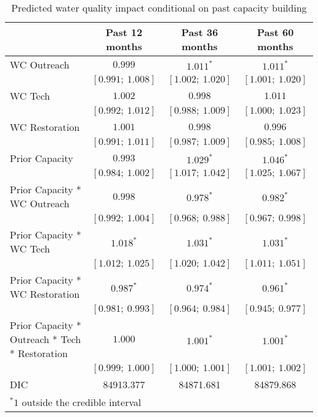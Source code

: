 
\begin{table}
\caption{Predicted water quality impact conditional on past capacity building}
\begin{center}
\begin{tabular}{l c c c }
\hline
                                               & Past 12 months & Past 36 months & Past 60 months \\
\hline
WC Outreach                                    & $0.999$           & $1.011^{*}$       & $1.011^{*}$       \\
                                               & $[0.991;\ 1.008]$ & $[1.002;\ 1.020]$ & $[1.001;\ 1.020]$ \\
WC Tech                                        & $1.002$           & $0.998$           & $1.011$           \\
                                               & $[0.992;\ 1.012]$ & $[0.988;\ 1.009]$ & $[1.000;\ 1.023]$ \\
WC Restoration                                 & $1.001$           & $0.998$           & $0.996$           \\
                                               & $[0.991;\ 1.011]$ & $[0.987;\ 1.009]$ & $[0.985;\ 1.008]$ \\
Prior Capacity                                 & $0.993$           & $1.029^{*}$       & $1.046^{*}$       \\
                                               & $[0.984;\ 1.002]$ & $[1.017;\ 1.042]$ & $[1.025;\ 1.067]$ \\
Prior Capacity * WC Outreach                   & $0.998$           & $0.978^{*}$       & $0.982^{*}$       \\
                                               & $[0.992;\ 1.004]$ & $[0.968;\ 0.988]$ & $[0.967;\ 0.998]$ \\
Prior Capacity * WC Tech                       & $1.018^{*}$       & $1.031^{*}$       & $1.031^{*}$       \\
                                               & $[1.012;\ 1.025]$ & $[1.020;\ 1.042]$ & $[1.011;\ 1.051]$ \\
Prior Capacity * WC Restoration                & $0.987^{*}$       & $0.974^{*}$       & $0.961^{*}$       \\
                                               & $[0.981;\ 0.993]$ & $[0.964;\ 0.984]$ & $[0.945;\ 0.977]$ \\
Prior Capacity * Outreach * Tech * Restoration & $1.000$           & $1.001^{*}$       & $1.001^{*}$       \\
                                               & $[0.999;\ 1.000]$ & $[1.000;\ 1.001]$ & $[1.001;\ 1.002]$ \\
\hline
DIC                                            & 84913.377         & 84871.681         & 84879.868         \\
\hline
\multicolumn{4}{l}{\scriptsize{$^* 1$ outside the credible interval}}
\end{tabular}
\label{table:capacityfunding}
\end{center}
\end{table}
